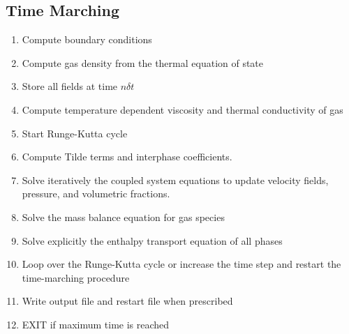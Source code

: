 \subsection{Time Marching}
\begin{enumerate}
\item Compute boundary conditions
\item Compute gas density from the thermal equation of state
\item Store all fields at time $n\delta t$
\item Compute temperature dependent viscosity and thermal conductivity of gas
\item Start Runge-Kutta cycle
\item Compute Tilde terms and interphase coefficients.
\item Solve iteratively the coupled system equations to update velocity fields,
pressure, and volumetric fractions.
\item Solve the mass balance equation for gas species
\item Solve explicitly the enthalpy transport equation of all phases
\item Loop over the Runge-Kutta cycle or increase the time step and restart the time-marching procedure
\item Write output file and restart file when prescribed
\item EXIT if maximum time is reached
\end{enumerate}
\clearpage

